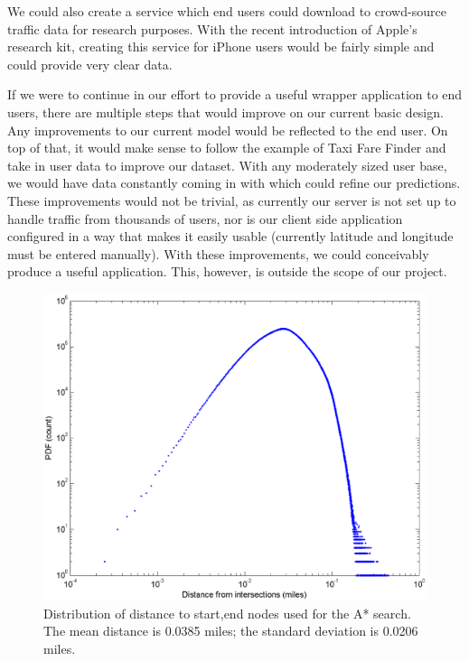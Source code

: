 \documentclass{sig-alternate}
\begin{document}
We could also create a service which end users could download to crowd-source traffic data for research purposes. With the recent introduction of Apple's research kit, creating this service for iPhone users would be fairly simple and could provide very clear data.

If we were to continue in our effort to provide a useful wrapper application to end users, there are multiple steps that would improve on our current basic design.  Any improvements to our current model would be reflected to the end user.  On top of that, it would make sense to follow the example of Taxi Fare Finder and take in user data to improve our dataset.  With any moderately sized user base, we would have data constantly coming in with which could refine our predictions.  These improvements would not be trivial, as currently our server is not set up to handle traffic from thousands of users, nor is our client side application configured in a way that makes it easily usable (currently latitude and longitude must be entered manually).  With these improvements, we could conceivably produce a useful application.  This, however, is outside the scope of our project.


\begin{figure}
\includegraphics[scale=0.20]{epdf.eps}
\caption{Distribution of distance to start,end nodes used for the A* search. The mean distance is 0.0385 miles; the standard deviation is 0.0206 miles.}
\end{figure}



%
%
\end{document}
